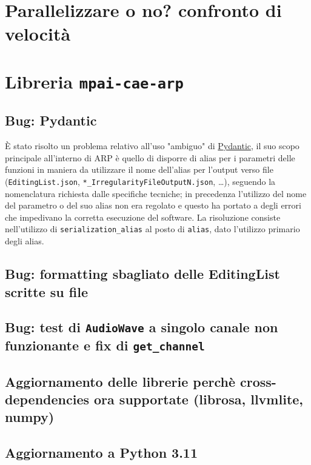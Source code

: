 \section{Parallelizzare o no? confronto di velocità} \label{sec:parallelizzazione}
\section{Libreria \texttt{mpai-cae-arp}} \label{sec:lib-mpaicaearp} %
\subsection{Bug: Pydantic} \label{ssec:mpaicaearp-pydantic}    %
È stato risolto un problema relativo all'uso "ambiguo" di \href{https://docs.pydantic.dev/1.10/}{Pydantic}, il suo scopo principale all'interno di \ac{ARP} è quello di disporre di alias per i parametri delle funzioni in maniera da utilizzare il nome dell'alias per l'output verso file (\texttt{EditingList.json}, \verb|*_IrregularityFileOutputN.json|, \dots), seguendo la nomenclatura richiesta dalle specifiche tecniche; in precedenza l'utilizzo del nome del parametro o del suo alias non era regolato e questo ha portato a degli errori che impedivano la corretta esecuzione del software.
La risoluzione consiste nell'utilizzo di \verb|serialization_alias| al posto di \texttt{alias}, dato l'utilizzo primario degli alias.
\subsection{Bug: formatting sbagliato delle EditingList scritte su file}
\subsection{Bug: test di \texttt{AudioWave} a singolo canale non funzionante e fix di \verb|get_channel|}
\subsection{Aggiornamento delle librerie perchè cross-dependencies ora supportate (librosa, llvmlite, numpy)}
\subsection{Aggiornamento a Python 3.11} \label{ssec:py-311}
